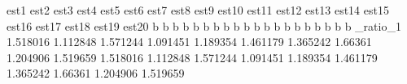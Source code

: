 	est1	est2	est3	est4	est5	est6	est7	est8	est9	est10	est11	est12	est13	est14	est15	est16	est17	est18	est19	est20
	b	b	b	b	b	b	b	b	b	b	b	b	b	b	b	b	b	b	b	b
_ratio_1	1.518016	1.112848	1.571244	1.091451	1.189354	1.461179	1.365242	1.66361	1.204906	1.519659	1.518016	1.112848	1.571244	1.091451	1.189354	1.461179	1.365242	1.66361	1.204906	1.519659
